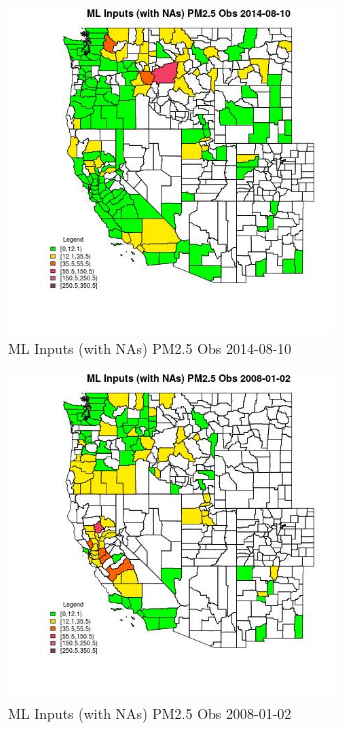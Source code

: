 \begin{figure} 
\centering  
\includegraphics[width=0.77\textwidth]{Code_Outputs/Report_ML_input_PM25_Step4_part_e_de_duplicated_aves_compiled_2019-05-18wNAs_CountyPM25_ObsMean2014-08-10.jpg} 
\caption{\label{fig:Report_ML_input_PM25_Step4_part_e_de_duplicated_aves_compiled_2019-05-18wNAsCountyPM25_ObsMean2014-08-10}ML Inputs (with NAs) PM2.5 Obs 2014-08-10} 
\end{figure} 
 

\begin{figure} 
\centering  
\includegraphics[width=0.77\textwidth]{Code_Outputs/Report_ML_input_PM25_Step4_part_e_de_duplicated_aves_compiled_2019-05-18wNAs_CountyPM25_ObsMean2008-01-02.jpg} 
\caption{\label{fig:Report_ML_input_PM25_Step4_part_e_de_duplicated_aves_compiled_2019-05-18wNAsCountyPM25_ObsMean2008-01-02}ML Inputs (with NAs) PM2.5 Obs 2008-01-02} 
\end{figure} 
 

